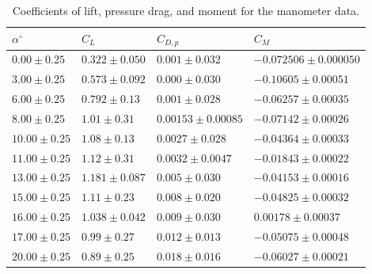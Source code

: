 \documentclass[runningheads]{llncs}
\begin{document}
\begin{table}[h]
\centering
\begin{tabular}{p{3cm}p{3cm}p{3cm}p{3cm}}
\toprule
$\alpha^\circ$ & $C_L$ & $C_{D,p}$ & $C_M$ \\
\midrule
 $0.00\pm0.25$ & $0.322\pm0.050$ &  $0.001\pm0.032$ &  $-0.072506\pm0.000050$ \\
 $3.00\pm0.25$ & $0.573\pm0.092$ &  $0.000\pm0.030$ & $-0.10605\pm0.00051$ \\
 $6.00\pm0.25$ & $0.792\pm0.13$ & $0.001\pm0.028$ &  $-0.06257\pm0.00035$ \\
 $8.00\pm0.25$ & $1.01\pm0.31$ & $0.00153\pm0.00085$ & $-0.07142\pm0.00026$ \\
$10.00\pm0.25$ & $1.08\pm0.13$ & $0.0027\pm0.028$ & $-0.04364\pm0.00033$ \\
$11.00\pm0.25$ & $1.12\pm0.31$ & $0.0032\pm0.0047$ & $-0.01843\pm0.00022$ \\
$13.00\pm0.25$ & $1.181\pm0.087$ &  $0.005\pm0.030$ & $-0.04153\pm0.00016$ \\
$15.00\pm0.25$ & $1.11\pm0.23$ & $0.008\pm0.020$ & $-0.04825\pm0.00032$ \\
$16.00\pm0.25$ & $1.038\pm0.042$ & $0.009\pm0.030$ &  $0.00178\pm0.00037$ \\
$17.00\pm0.25$ & $0.99\pm0.27$ & $0.012\pm0.013$ &  $-0.05075\pm0.00048$ \\
$20.00\pm0.25$ & $0.89\pm0.25$ & $0.018\pm0.016$ & $-0.06027\pm0.00021$ \\
\bottomrule
\end{tabular}
\caption{Coefficients of lift, pressure drag, and moment for the manometer data.}
\label{tab:mano_coeff}
\end{table}
\end{document}
